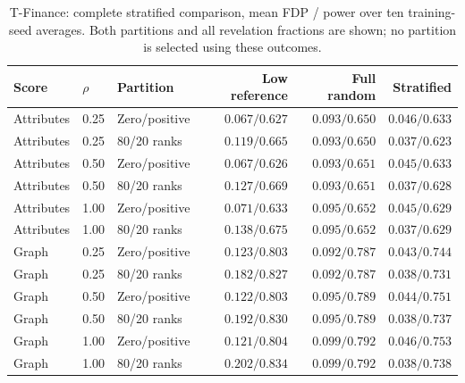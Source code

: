 \begin{table}[t]\centering\small
\caption{T-Finance: complete stratified comparison, mean FDP / power over ten training-seed averages. Both partitions and all revelation fractions are shown; no partition is selected using these outcomes.}
\begin{tabular}{lllrrr}\toprule Score & $\rho$ & Partition & Low reference & Full random & Stratified\\\midrule
Attributes & 0.25 & Zero/positive & $0.067/0.627$ & $0.093/0.650$ & $0.046/0.633$ \\
Attributes & 0.25 & 80/20 ranks & $0.119/0.665$ & $0.093/0.650$ & $0.037/0.623$ \\
Attributes & 0.50 & Zero/positive & $0.067/0.626$ & $0.093/0.651$ & $0.045/0.633$ \\
Attributes & 0.50 & 80/20 ranks & $0.127/0.669$ & $0.093/0.651$ & $0.037/0.628$ \\
Attributes & 1.00 & Zero/positive & $0.071/0.633$ & $0.095/0.652$ & $0.045/0.629$ \\
Attributes & 1.00 & 80/20 ranks & $0.138/0.675$ & $0.095/0.652$ & $0.037/0.629$ \\
Graph & 0.25 & Zero/positive & $0.123/0.803$ & $0.092/0.787$ & $0.043/0.744$ \\
Graph & 0.25 & 80/20 ranks & $0.182/0.827$ & $0.092/0.787$ & $0.038/0.731$ \\
Graph & 0.50 & Zero/positive & $0.122/0.803$ & $0.095/0.789$ & $0.044/0.751$ \\
Graph & 0.50 & 80/20 ranks & $0.192/0.830$ & $0.095/0.789$ & $0.038/0.737$ \\
Graph & 1.00 & Zero/positive & $0.121/0.804$ & $0.099/0.792$ & $0.046/0.753$ \\
Graph & 1.00 & 80/20 ranks & $0.202/0.834$ & $0.099/0.792$ & $0.038/0.738$ \\
\bottomrule\end{tabular}\end{table}


